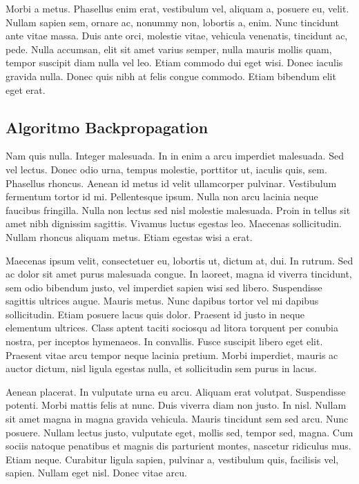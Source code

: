 Morbi a metus. Phasellus enim erat, vestibulum vel, aliquam a, posuere eu, velit. Nullam sapien sem, ornare ac, nonummy non, lobortis a, enim. Nunc tincidunt ante vitae massa. Duis ante orci, molestie vitae, vehicula venenatis, tincidunt ac, pede. Nulla accumsan, elit sit amet varius semper, nulla mauris mollis quam, tempor suscipit diam nulla vel leo. Etiam commodo dui eget wisi. Donec iaculis gravida nulla. Donec quis nibh at felis congue commodo. Etiam bibendum elit eget erat.

\subsection{Algoritmo Backpropagation}

Nam quis nulla. Integer malesuada. In in enim a arcu imperdiet malesuada. Sed vel lectus. Donec odio urna, tempus molestie, porttitor ut, iaculis quis, sem. Phasellus rhoncus. Aenean id metus id velit ullamcorper pulvinar. Vestibulum fermentum tortor id mi. Pellentesque ipsum. Nulla non arcu lacinia neque faucibus fringilla. Nulla non lectus sed nisl molestie malesuada. Proin in tellus sit amet nibh dignissim sagittis. Vivamus luctus egestas leo. Maecenas sollicitudin. Nullam rhoncus aliquam metus. Etiam egestas wisi a erat.

Maecenas ipsum velit, consectetuer eu, lobortis ut, dictum at, dui. In rutrum. Sed ac dolor sit amet purus malesuada congue. In laoreet, magna id viverra tincidunt, sem odio bibendum justo, vel imperdiet sapien wisi sed libero. Suspendisse sagittis ultrices augue. Mauris metus. Nunc dapibus tortor vel mi dapibus sollicitudin. Etiam posuere lacus quis dolor. Praesent id justo in neque elementum ultrices. Class aptent taciti sociosqu ad litora torquent per conubia nostra, per inceptos hymenaeos. In convallis. Fusce suscipit libero eget elit. Praesent vitae arcu tempor neque lacinia pretium. Morbi imperdiet, mauris ac auctor dictum, nisl ligula egestas nulla, et sollicitudin sem purus in lacus.

Aenean placerat. In vulputate urna eu arcu. Aliquam erat volutpat. Suspendisse potenti. Morbi mattis felis at nunc. Duis viverra diam non justo. In nisl. Nullam sit amet magna in magna gravida vehicula. Mauris tincidunt sem sed arcu. Nunc posuere. Nullam lectus justo, vulputate eget, mollis sed, tempor sed, magna. Cum sociis natoque penatibus et magnis dis parturient montes, nascetur ridiculus mus. Etiam neque. Curabitur ligula sapien, pulvinar a, vestibulum quis, facilisis vel, sapien. Nullam eget nisl. Donec vitae arcu.

